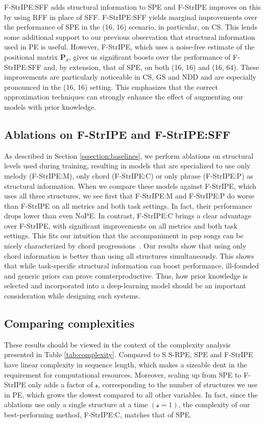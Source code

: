 F-StrIPE:SFF adds structural information to SPE and F-StrIPE improves on this by using RFF in place of SFF. F-StrIPE:SFF yields marginal improvements over the performance of SPE in the (16, 16) scenario, in particular, on CS. This lends some additional support to our previous observation that structural information used in PE is useful. However, F-StrIPE, which uses a noise-free estimate of the positional matrix $\mathbf{P}_d$, gives us significant boosts over the performance of F-StrIPE:SFF and, by extension, that of SPE, on both (16, 16) and (16, 64). These improvements are particularly noticeable in CS, GS and NDD and are especially pronounced in the (16, 16) setting. This emphasizes that the correct approximation techniques can strongly enhance the effect of augmenting our models with prior knowledge.

\subsection{Ablations on F-StrIPE and F-StrIPE:SFF}

As described in Section \ref{sssection:baselines}, we perform ablations on structural levels used during training, resulting in models that are specialized to use only melody (F-StrIPE:M), only chord (F-StrIPE:C) or only phrase (F-StrIPE:P) as structural information. When we compare these models against F-StrIPE, which uses all three structures, we see first that F-StrIPE:M and F-StrIPE:P do worse than F-StrIPE on all metrics and both task settings. In fact, their performance drops lower than even NoPE. In contrast, F-StrIPE:C brings a clear advantage over F-StrIPE, with significant improvements on all metrics and both task settings. This fits our intuition that the accompaniment in pop songs can be nicely characterized by chord progressions~\cite{paiement_probabilistic_2005,zhu_xiaoice_2018}. Our results show that using only chord information is better than using all structures simultaneously. This shows that while task-specific structural information can boost performance, ill-founded and generic priors can prove counterproductive. Thus, how prior knowledge is selected and incorporated into a deep-learning model should be an important consideration while designing such systems.

\subsection{Comparing complexities}

These results should be viewed in the context of the complexity analysis presented in Table \ref{tab:complexity}. Compared to S S-RPE, SPE and F-StrIPE have linear complexity in sequence length, which makes a sizeable dent in the requirement for computational resources. Moreover, scaling up from SPE to F-StrIPE only adds a factor of $\mathcal{s}$, corresponding to the number of structures we use in PE, which grows the slowest compared to all other variables. In fact, since the ablations use only a single structure at a time $(\mathcal{s} = 1)$, the complexity of our best-performing method, F-StrIPE:C, matches that of SPE.

